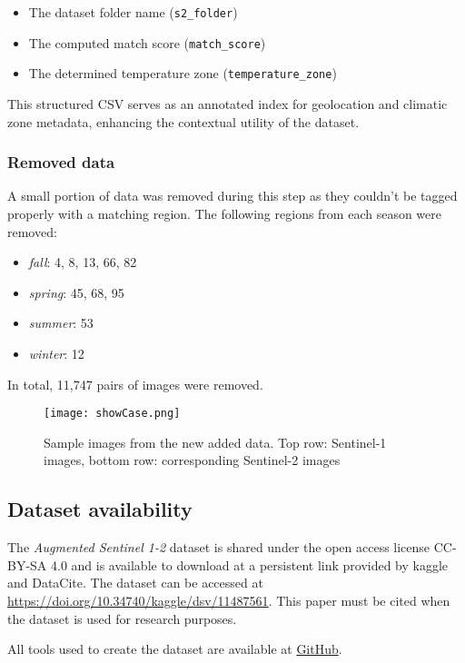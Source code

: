 \begin{itemize}
    \item The dataset folder name (\texttt{s2\_folder})
    \item The computed match score (\texttt{match\_score})
    \item The determined temperature zone (\texttt{temperature\_zone})
\end{itemize}

This structured CSV serves as an annotated index for geolocation and climatic zone metadata, enhancing the contextual utility of the dataset.

\subsubsection{Removed data}
A small portion of data was removed during this step as they couldn't be tagged properly with a matching region. The following regions from each season were removed: 

\begin{itemize}
    \item \textit{fall}: 4, 8, 13, 66, 82
    \item \textit{spring}: 45, 68, 95
    \item \textit{summer}: 53
    \item \textit{winter}: 12
\end{itemize}

In total, 11,747 pairs of images were removed.

\begin{figure*}[t]
    \texttt{[image: showCase.png]}
    \caption{Sample images from the new added data. Top row: Sentinel-1 images, bottom row: corresponding Sentinel-2 images}
    \label{fig:showCase}
\end{figure*}

\subsection{Dataset availability}
The \textit{Augmented Sentinel 1-2} dataset is shared under the open access license CC-BY-SA 4.0 and is available to download at a persistent link provided by kaggle and DataCite. The dataset can be accessed at \url{https://doi.org/10.34740/kaggle/dsv/11487561}. This paper must be cited when the dataset is used for research purposes.

All tools used to create the dataset are available at \href{https://github.com/ShambaC/SAR-Image-Colorisation/tree/main/Dataset%20Tools}{GitHub}.